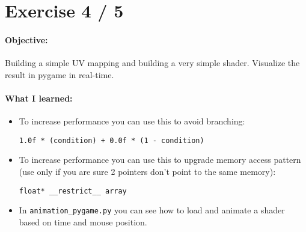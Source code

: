 \documentclass{article}
\begin{document}
\newpage
\section{Exercise 4 / 5}

\paragraph{Objective:}

Building a simple UV mapping and building a very simple shader. Visualize the result in pygame in real-time.

\paragraph{What I learned:}
\begin{itemize}
  \item To increase performance you can use this to avoid branching:
  \begin{lstlisting}[caption=Branchless-conditions]
1.0f * (condition) + 0.0f * (1 - condition)
  \end{lstlisting}
  \item To increase performance you can use this to upgrade memory access pattern (use only if you are sure 2 pointers don't point to the same memory):
  \begin{lstlisting}[caption=Restrict access]
float* __restrict__ array
  \end{lstlisting}
  \item In \texttt{animation\_pygame.py} you can see how to load and animate a shader based on time and mouse position.
\end{itemize}
\end{document}
